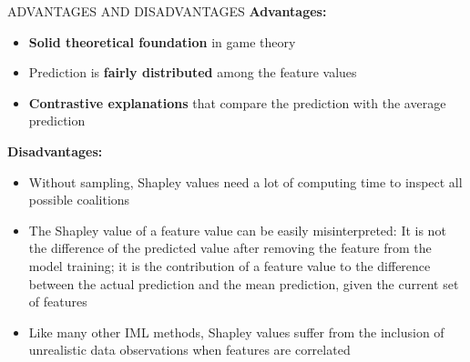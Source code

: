 \documentclass[11pt,compress,t,notes=noshow, aspectratio=169, xcolor=table]{beamer}
\begin{document}

\begin{vbframe}{ADVANTAGES AND DISADVANTAGES}
	\textbf{Advantages:}
	\begin{itemize}
	 \item \textbf{Solid theoretical foundation} in game theory
        \item Prediction is \textbf{fairly distributed} among the feature values
        \item \textbf{Contrastive explanations} that compare the prediction with the average prediction
	\end{itemize}
\vspace{0.25cm}
	\textbf{Disadvantages:}
	\begin{itemize}
		\item 	Without sampling, Shapley values need a lot of computing time to
		inspect all possible coalitions
		\item The Shapley value of a feature value can be easily misinterpreted:
		It is not the difference of the predicted value after removing the
		feature from the model training; it is the contribution of a feature
		value to the difference between the actual prediction and the mean
		prediction, given the current set of features
		\item Like many other IML methods, Shapley values suffer from the
		inclusion of unrealistic data observations when features are
		correlated
	\end{itemize}



\end{vbframe}

\endlecture
\end{document}
